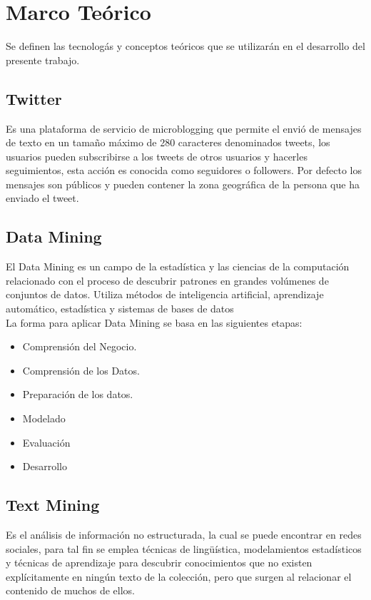 %
\chapter{Marco Te\'orico}

Se definen las tecnolog\'as y conceptos te\'oricos que se utilizar\'an en el desarrollo del presente trabajo.


\section{Twitter}
\setcounter{equation}{0}

Es una plataforma de servicio de microblogging que permite el envi\'o de mensajes de texto en un tamaño m\'aximo de 280 caracteres denominados tweets, los usuarios pueden subscribirse a los tweets de otros usuarios y hacerles seguimientos, esta acci\'on es conocida como seguidores o followers. Por defecto los mensajes son p\'ublicos y pueden contener la zona geogr\'afica de la persona que ha enviado el tweet. 



\section{Data Mining}

El Data Mining es un campo de la estad\'istica y las ciencias de la computaci\'on relacionado con el proceso de descubrir patrones en grandes vol\'umenes de conjuntos de datos. Utiliza m\'etodos de inteligencia artificial, aprendizaje autom\'atico, estad\'istica y sistemas de bases de datos \\

La forma para aplicar Data Mining se basa en las siguientes etapas:

\begin{itemize}
\item Comprensión del Negocio.
\item Comprensión de los Datos.
\item Preparación de los datos.
\item Modelado
\item Evaluación 
\item Desarrollo
\end{itemize}

\section{Text Mining}

Es el an\'alisis de informaci\'on no estructurada, la cual se puede encontrar en redes sociales, para tal fin se emplea t\'ecnicas de ling\"uística, modelamientos estad\'isticos y t\'ecnicas de aprendizaje para descubrir conocimientos que no existen explícitamente en ning\'un texto de la colecci\'on, pero que surgen al relacionar el contenido de muchos de ellos. \\

